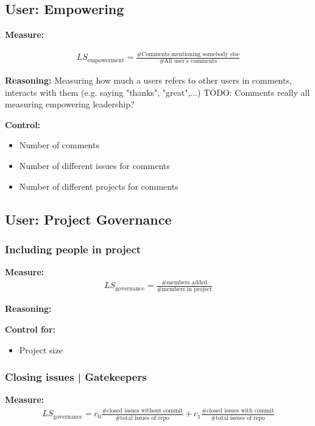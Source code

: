 \documentclass[a4paper,10pt]{article}
\begin{document}
\subsection{User: Empowering}
\textbf{Measure:}

\begin{align}
 LS_{\text{empowerment}} = \frac{\text{\# Comments mentioning somebody else}}{\text{\# All user's comments}}
\end{align}

\textbf{Reasoning:} Measuring how much a users refers to other users in comments, interacts with them (e.g. saying "thanks", "great",...)
TODO: Comments really all measuring empowering leadership?

\textbf{Control:} 
\begin{itemize}
 \item Number of comments
\item Number of different issues for comments
\item Number of different projects for comments
\end{itemize}





\subsection{User: Project Governance}
\subsubsection{Including people in project}

\textbf{Measure:}
\begin{align}
 LS_{\text{governance}} = \frac{\text{\# members added}}{\text{\# members in project}}
\end{align}

\textbf{Reasoning:}

\textbf{Control for:}
\begin{itemize}
 \item Project size
\end{itemize}


\subsubsection{Closing issues | Gatekeepers}
\textbf{Measure:}
\begin{align}
 LS_{\text{governance}} = c_{0}\frac{\text{\# closed issues without commit}}{\text{\# total issues of repo}} + c_{1} \frac{\text{\# closed issues with commit}}{\text{\# total issues of repo}}
\end{align}
\end{document}
